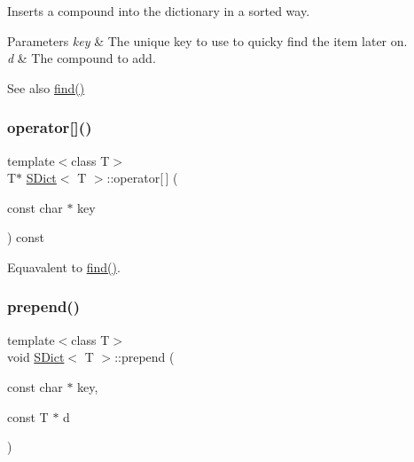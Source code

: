 Inserts a compound into the dictionary in a sorted way. 
\begin{DoxyParams}{Parameters}
{\em key} & The unique key to use to quicky find the item later on. \\
\hline
{\em d} & The compound to add. \\
\hline
\end{DoxyParams}
\begin{DoxySeeAlso}{See also}
\mbox{\hyperlink{class_s_dict_aec67482d780157680d46f48a7ed5e7bd}{find()}} 
\end{DoxySeeAlso}
\mbox{\label{class_s_dict_a84c35184adf3011e621afcaff550ba86}} 
\subsubsection{\texorpdfstring{operator[]()}{operator[]()}}
{\footnotesize\ttfamily template$<$class T$>$ \\
T$\ast$ \mbox{\hyperlink{class_s_dict}{S\+Dict}}$<$ T $>$\+::operator\mbox{[}$\,$\mbox{]} (\begin{DoxyParamCaption}\item[{const char $\ast$}]{key }\end{DoxyParamCaption}) const\hspace{0.3cm}{\ttfamily [inline]}}

Equavalent to \mbox{\hyperlink{class_s_dict_aec67482d780157680d46f48a7ed5e7bd}{find()}}. \mbox{\label{class_s_dict_adcfbdc244e81360522457c8a84069f2b}} 
\subsubsection{\texorpdfstring{prepend()}{prepend()}}
{\footnotesize\ttfamily template$<$class T$>$ \\
void \mbox{\hyperlink{class_s_dict}{S\+Dict}}$<$ T $>$\+::prepend (\begin{DoxyParamCaption}\item[{const char $\ast$}]{key,  }\item[{const T $\ast$}]{d }\end{DoxyParamCaption})\hspace{0.3cm}{\ttfamily [inline]}}

